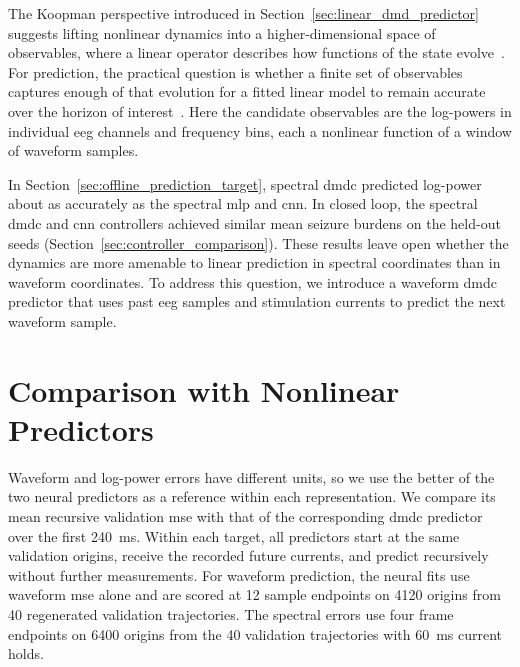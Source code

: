 The Koopman perspective introduced in Section~\ref{sec:linear_dmd_predictor} suggests lifting nonlinear dynamics into a higher-dimensional space of observables, where a linear operator describes how functions of the state evolve~\cite{Brunton2016}.
For prediction, the practical question is whether a finite set of observables captures enough of that evolution for a fitted linear model to remain accurate over the horizon of interest~\cite{Williams2015}.
Here the candidate observables are the log-powers in individual \ac{eeg} channels and frequency bins, each a nonlinear function of a window of waveform samples.

In Section~\ref{sec:offline_prediction_target}, spectral \ac{dmdc} predicted log-power about as accurately as the spectral \ac{mlp} and \ac{cnn}.
In closed loop, the spectral \ac{dmdc} and \ac{cnn} controllers achieved similar mean seizure burdens on the held-out seeds (Section~\ref{sec:controller_comparison}).
These results leave open whether the dynamics are more amenable to linear prediction in spectral coordinates than in waveform coordinates.
To address this question, we introduce a waveform \ac{dmdc} predictor that uses past \ac{eeg} samples and stimulation currents to predict the next waveform sample.

\section{Comparison with Nonlinear Predictors}

Waveform and log-power errors have different units, so we use the better of the two neural predictors as a reference within each representation.
We compare its mean recursive validation \ac{mse} with that of the corresponding \ac{dmdc} predictor over the first \SI{240}{\milli\second}.
Within each target, all predictors start at the same validation origins, receive the recorded future currents, and predict recursively without further measurements.
For waveform prediction, the neural fits use waveform \ac{mse} alone and are scored at 12 sample endpoints on \num{4120} origins from 40 regenerated validation trajectories.
The spectral errors use four frame endpoints on \num{6400} origins from the 40 validation trajectories with \SI{60}{\milli\second} current holds.

